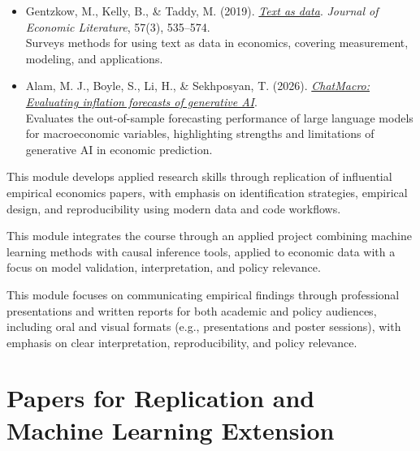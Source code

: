 \documentclass[11pt]{article}
\newcommand{\coloredsection}[1]{%
    \section*{\large\textcolor{sectioncolor}{#1}}%
}
\begin{document}
\begin{description}[leftmargin=0cm, labelindent=0cm, itemsep=1em]
\begin{itemize}[leftmargin=1.5em]
\item Gentzkow, M., Kelly, B., \& Taddy, M. (2019).
\href{https://www.aeaweb.org/articles?id=10.1257/jel.20181020}{\textit{Text as data}}.
\textit{Journal of Economic Literature}, 57(3), 535--574. \\
Surveys methods for using text as data in economics, covering measurement, modeling, and applications.

\item Alam, M. J., Boyle, S., Li, H., \& Sekhposyan, T. (2026).
\href{https://www.frbsf.org/wp-content/uploads/wp2026-04.pdf}{\textit{ChatMacro: Evaluating inflation forecasts of generative AI}}. \\
Evaluates the out-of-sample forecasting performance of large language models for macroeconomic variables, highlighting strengths and limitations of generative AI in economic prediction.

\end{itemize}


\item[\textbf{Module 8: Empirical Replication}]
This module develops applied research skills through replication of influential empirical economics papers, with emphasis on identification strategies, empirical design, and reproducibility using modern data and code workflows.

\item[\textbf{Module 9: Applied Machine Learning and Causal Project}]
This module integrates the course through an applied project combining machine learning methods with causal inference tools, applied to economic data with a focus on model validation, interpretation, and policy relevance.

\item[\textbf{Module 10: Research Communication}]
This module focuses on communicating empirical findings through professional presentations and written reports for both academic and policy audiences, including oral and visual formats (e.g., presentations and poster sessions), with emphasis on clear interpretation, reproducibility, and policy relevance.

\end{description}








\coloredsection{Papers for Replication and Machine Learning Extension}
\end{document}
